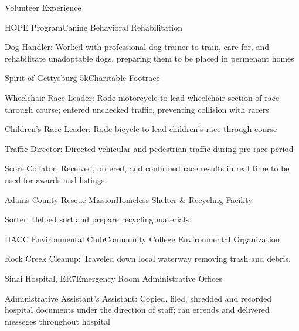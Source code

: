 \documentclass{resume} %
\begin{document}
\begin{rSection}{Volunteer Experience}


\begin{rSubsection}{HOPE Program}{}{Canine Behavioral Rehabilitation}{}
\item Dog Handler: Worked with professional dog trainer to train, care for, and rehabilitate unadoptable dogs, preparing them to be placed in permenant homes
\end{rSubsection}


\begin{rSubsection}{Spirit of Gettysburg 5k}{}{Charitable Footrace}{}
\item Wheelchair Race Leader: Rode motorcycle to lead wheelchair section of race through course; entered unchecked traffic, preventing collision with racers
\item Children's Race Leader: Rode bicycle to lead children's race through course
\item Traffic Director: Directed vehicular and pedestrian traffic during pre-race period
\item Score Collator: Received, ordered, and confirmed race results in real time to be used for awards and listings.
\end{rSubsection}


\begin{rSubsection}{Adams County Rescue Mission}{}{Homeless Shelter \& Recycling Facility}{}
\item Sorter: Helped sort and prepare recycling materials.
\end{rSubsection}


\begin{rSubsection}{HACC Environmental Club}{}{Community College Environmental Organization}{}
\item Rock Creek Cleanup: Traveled down local waterway removing trash and debris.
\end{rSubsection}


\begin{rSubsection}{Sinai Hospital, ER7}{}{Emergency Room Administrative Offices}{}
\item Administrative Assistant's Assistant: Copied, filed, shredded and recorded hospital documents under the direction of staff; ran errends and delivered messeges throughout hospital
\end{rSubsection}

\end{rSection}
\end{document}
